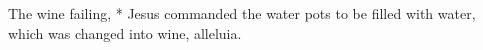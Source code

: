 The wine failing, * Jesus commanded the water pots to be filled with water, which was changed into wine, alleluia.